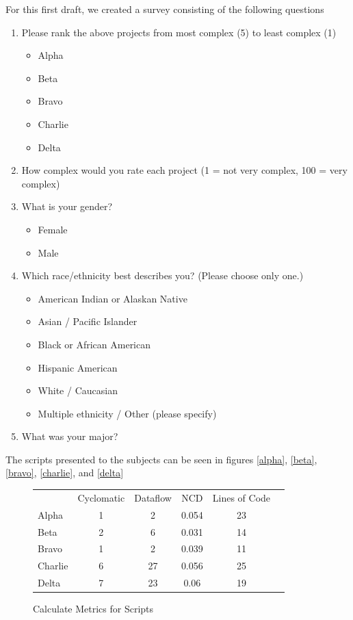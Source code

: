 \documentclass[]{article}
\begin{document}
For this first draft, we created a survey consisting of the following questions
\begin{enumerate}
	\item Please rank the above projects from most complex (5) to least complex (1)
	\begin{itemize}
		\item Alpha
		\item Beta
		\item Bravo
		\item Charlie
		\item Delta
	\end{itemize}
	\item How complex would you rate each project (1 = not very complex, 100 = very complex)
	\item What is your gender?
	\begin{itemize}
		\item Female
		\item Male
	\end{itemize}
	\item Which race/ethnicity best describes you? (Please choose only one.)
	\begin{itemize}
		\item American Indian or Alaskan Native
		\item Asian / Pacific Islander
		\item Black or African American
		\item Hispanic American
		\item White / Caucasian
		\item Multiple ethnicity / Other (please specify)
	\end{itemize}
	\item What was your major?
\end{enumerate}

The scripts presented to the subjects can be seen in figures \ref{alpha}, \ref{beta}, \ref{bravo}, \ref{charlie}, and \ref{delta}

\begin{figure}[fh!]
	\caption{Calculate Metrics for Scripts}
	\label{calculate_metrics}
	\centering
	\begin{tabular}{l || c | c | c | c| c }
		& Cyclomatic & Dataflow & NCD & Lines of Code \\
		Alpha & 1 & 2 & 0.054 & 23 \\
		Beta & 2 & 6 & 0.031 & 14 \\
		Bravo & 1 & 2 & 0.039 & 11 \\
		Charlie & 6 & 27 & 0.056 & 25 \\
		Delta & 7 & 23 & 0.06 & 19
	\end{tabular}
\end{figure}
\end{document}
